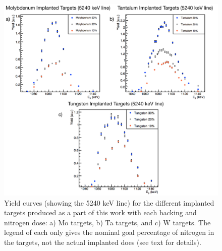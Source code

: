 \begin{figure}
\includegraphics[width=\linewidth]{figures/impComp.png}
\caption{Yield curves (showing the 5240 keV line) for the different implanted targets produced as a part of this work with each backing and nitrogen dose: a) Mo targets, b) Ta targets, and c) W targets. The legend of each only gives the nominal goal percentage of nitrogen in the targets, not the actual implanted does (see text for details).}
\label{fig: yieldCurves}
\end{figure}


